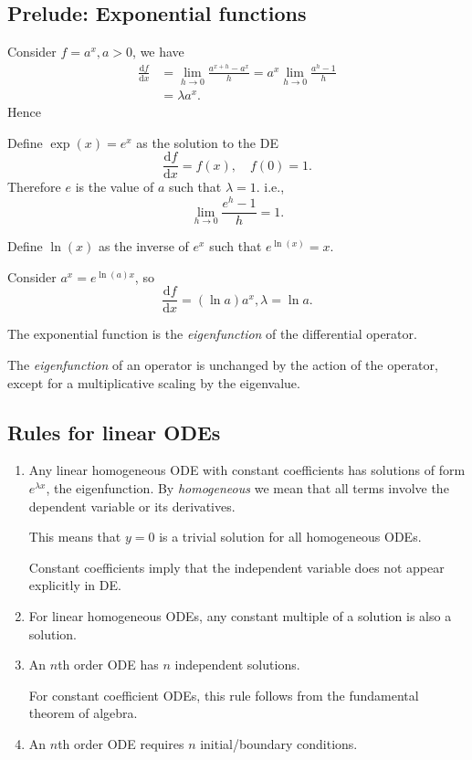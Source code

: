 \documentclass[a4paper]{article}
\begin{document}
    \subsection{Prelude: Exponential functions}
    Consider $f=a^x, a>0$, we have
    \[
        \begin{aligned}
             \frac{\mathrm{d}f}{\mathrm{d}x} &= \lim_{h \to 0} \frac{a^{x+h}-a^x}{h}=a^x \lim_{h \to 0} \frac{a^h-1}{h}\\
            &= \lambda a^x.
        \end{aligned}
    \]
    Hence
    \begin{definition}
        Define $ \exp(x)=e^x $ as the solution to the DE 
        \[
            \frac{\mathrm{d}f}{\mathrm{d}x}=f(x), \quad f(0)=1 
        .\]
        Therefore $e$ is the value of $a$ such that $\lambda=1$. i.e.,
        \[
            \lim_{h \to 0} \frac{e^h-1}{h}=1
        .\]
    \end{definition}
    Define $ \ln (x) $ as the inverse of $e^x$ such that $ e^{\ln(x)}=x $.

    Consider $ a^x=e^{\ln(a)x}$, so 
    \[
        \frac{\mathrm{d}f}{\mathrm{d}x}=(\ln a)a^x, \lambda=\ln a 
    .\]

    The exponential function is the \textit{eigenfunction} of the differential operator.

    The \textit{eigenfunction} of an operator is unchanged by the action of the operator, except for a multiplicative scaling by the eigenvalue.
    \subsection{Rules for linear ODEs}
    \begin{enumerate}[\bfseries 1.]
        \item Any linear homogeneous ODE with constant coefficients has solutions of form $ e^{\lambda x} $, the eigenfunction. By \textit{homogeneous} we mean that all terms involve the dependent variable or its derivatives.

        This means that $y=0$ is a trivial solution for all homogeneous ODEs.

        Constant coefficients imply that the independent variable does not appear explicitly in DE.
        \item For linear homogeneous ODEs, any constant multiple of a solution is also a solution.
        \item An $n$th order ODE has $n$ independent solutions.

        For constant coefficient ODEs, this rule follows from the fundamental theorem of algebra.
        \item An $n$th order ODE requires $n$ initial/boundary conditions.
    \end{enumerate}
\end{document}

